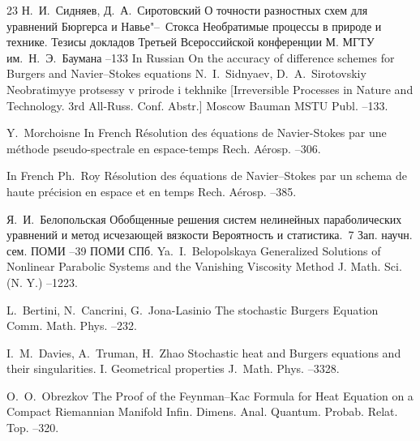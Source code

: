 \begin{thebibliography}{23}
\by Н.~И.~Сидняев, Д.~А.~Сиротовский
\paper О точности разностных схем для уравнений Бюргерса и Навье"--~Стокса
\inbook Необратимые процессы в природе и технике. Тезисы докладов Третьей Всероссийской конференции
\publaddr М.
\publ МГТУ им.~Н.~Э.~Баумана
--133
\misctransl
\lang In Russian
\paper On the accuracy of difference schemes for Burgers and Navier--Stokes equations
\by N.~I.~Sidnyaev, D.~A.~Sirotovskiy
\inbook Neobratimyye protsessy v prirode i tekhnike \rm [Irreversible Processes in Nature and Technology. 3rd All-Russ. Conf. Abstr.]
\publaddr  Moscow
\publ Bauman MSTU Publ.
--133.

\by Y.~Morchoisne
\lang In French
\paper R\'{e}solution des \'{e}quations de Navier-Stokes par une m\'{e}thode pseudo-spectrale en espace-temps
\jour Rech. A\'{e}rosp.
--306.

\lang In French
\by Ph.~Roy
\paper R\'{e}solution des \'{e}quations de Navier--Stokes par un schema de haute pr\'{e}cision en espace et en temps
\jour Rech. A\'{e}rosp.
--385.

\by Я.~И.~Белопольская
\paper Обобщенные решения систем нелинейных параболических уравнений и метод исчезающей вязкости
\inbook Вероятность и статистика.~7
\serial Зап. научн. сем. ПОМИ
--39
\publ ПОМИ
\publaddr СПб.
\transl
\by Ya.~I.~Belopolskaya
\paper  Generalized Solutions of Nonlinear Parabolic Systems and the Vanishing Viscosity Method
\jour J. Math. Sci. (N. Y.)
--1223.


\by L.~Bertini, N.~Cancrini, G.~Jona-Lasinio
\paper The stochastic Burgers Equation 
\jour Comm. Math. Phys.
--232.

\by I.~M.~Davies, A.~Truman, H.~Zhao
\paper  Stochastic heat and Burgers equations and their singularities. I. Geometrical properties 
\jour J.~Math. Phys.
--3328.

\by O.~O.~Obrezkov
\paper The Proof of the Feynman--Kac Formula for Heat Equation on a Compact Riemannian Manifold
\jour Infin. Dimens. Anal. Quantum. Probab. Relat. Top.
--320.


\end{thebibliography}
